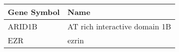 \begin{tabular}{ll}
\toprule
Gene Symbol &                          Name \\
\midrule
     ARID1B & AT rich interactive domain 1B \\
        EZR &                         ezrin \\
\bottomrule
\end{tabular}
